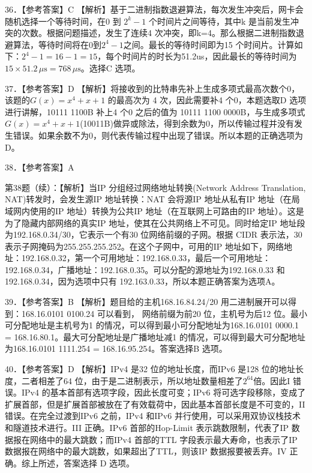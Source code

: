 \documentclass[UTF8,11pt]{ctexart}
\begin{document}
36．【参考答案】C 【解析】基于二进制指数退避算法，每次发生冲突后，网卡会随机选择一个等待时间，在0 到 \(\displaystyle 2^k-1\) 个时间片之间等待，其中k 是当前发生冲突的次数。根据问题描述，发生了连续4 次冲突，即k=4。那么根据二进制指数退避算法，等待时间将在0到\(\displaystyle 2^4-1\)之间。最长的等待时间即为15 个时间片。计算如下：\(\displaystyle 2^4-1=16-1=15\)，每个时间片的时长为51.2us，因此最长的等待时间为\(\displaystyle 15\times51.2\,\mu\mathrm{s}=768\,\mu\mathrm{s}\)。选择C 选项。


37．【参考答案】D 【解析】将接收到的比特串先补上生成多项式最高次数个0，该题的\(\displaystyle G(x)=x^4+x+1\) 的最高次为 4 次，因此需要补4 个0，本题选取D 选项进行讲解，10111 1100B 补上4 个0 之后的值为 10111 1100 0000B，与生成多项式\(\displaystyle G(x)=x^4+x+1\)(10011B)做异或除法，得到余数为0，所以传输过程并没有发生错误。如果余数不为0，则代表传输过程中出现了错误。所以本题的正确选项为D。


38．【参考答案】A


第38题（续）：【解析】当IP 分组经过网络地址转换(Network Address Translation, NAT)转发时，会发生源IP 地址转换：NAT 会将源IP 地址从私有IP 地址（在局域网内使用的IP 地址）转换为公共IP 地址（在互联网上可路由的IP 地址）。这是为了隐藏内部网络的真实IP 地址，使其在公共网络上不可见。同时给定IP 地址段为192.168.0.34/30，它表示一个有30 位网络前缀的子网。根据 CIDR 表示法，30 表示子网掩码为255.255.255.252。在这个子网中，可用的IP 地址如下，网络地址：192.168.0.32，第一个可用地址：192.168.0.33，最后一个可用地址：192.168.0.34，广播地址：192.168.0.35。可以分配的源地址为192.168.0.33 和192.168.0.34，因为选项中只有 192.163.0.33，所以本题正确答案为选项A。


39．【参考答案】B 【解析】题目给的主机168.16.84.24/20 用二进制展开可以得到：168.16.0101 0100.24 可以看到， 网络前缀为前20 位，主机号为后12 位。最小可分配地址是主机号为1 的情况，可以得到最小可分配地址为168.16.0101 0000.1 = 168.16.80.1。最大可分配地址是广播地址减1 的情况，可以得到最大可分配地址为168.16.0101 1111.254 = 168.16.95.254。答案选择B 选项。


40．【参考答案】D 【解析】IPv4 是32 位的地址长度，而IPv6 是128 位的地址长度，二者相差了64 位，由于是二进制表示，所以地址数量相差了\(\displaystyle 2^{64}\)倍。因此I 错误。IPv4 的基本首部有选项字段，因此长度可变；IPv6 将可选字段移除，变成了扩展首部，但是扩展首部被放在了有效载荷中，因此基本首部长度是不可变的，II 错误。在完全过渡到IPv6 之前，IPv4 和IPv6 并行使用，可以采用双协议栈技术和隧道技术进行。III 正确。IPv6 首部的Hop-Limit 表示跳数限制，代表了IP 数据报在网络中的最大跳数；而IPv4 首部的TTL 字段表示最大寿命，也表示了IP 数据报在网络中的最大跳数，如果超出了TTL，则该IP 数据报要被丢弃。IV 正确。综上所述，答案选择 D 选项。
\end{document}
